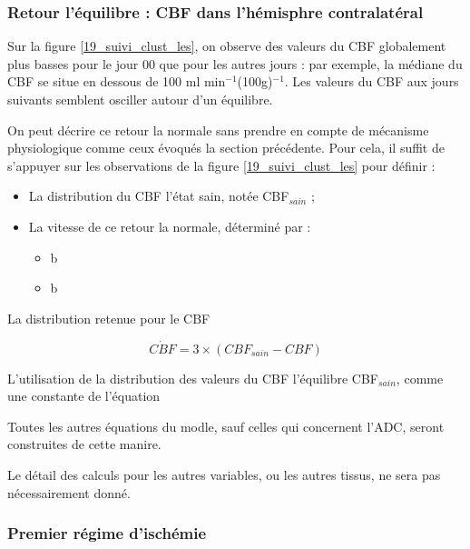\subsubsection{Retour  l'\'equilibre : CBF dans l'h\'emisphre contralat\'eral}

Sur la figure \ref{19_suivi_clust_les}, on observe des valeurs du CBF globalement plus basses pour le jour 00 que pour les autres jours : %
par exemple, la m\'ediane du CBF se situe en dessous de 100 ml min${}^{-1}$(100g)${}^{-1}$. %
Les valeurs du CBF aux jours suivants semblent osciller autour d'un \'equilibre.

\par
On peut d\'ecrire ce retour  la normale sans prendre en compte de m\'ecanisme physiologique comme ceux \'evoqu\'es  la section pr\'ec\'edente. %
Pour cela, il suffit de s'appuyer sur les observations de la figure \ref{19_suivi_clust_les} pour d\'efinir :
\begin{itemize}
\item La distribution du CBF  l'\'etat sain, not\'ee CBF${}_{sain}$ ;
\item La vitesse de ce retour  la normale, d\'etermin\'e par :
\begin{itemize}
\item b
\item b
\end{itemize}
\end{itemize}

La distribution retenue pour le CBF 

\begin{equation}
\dot{CBF}=3\times (CBF_{sain}-CBF)
\end{equation}

\par
L'utilisation de la distribution des valeurs du CBF  l'\'equilibre CBF${}_{sain}$, comme une constante de l'\'equation 


\par
Toutes les autres \'equations du modle, sauf celles qui concernent l'ADC, seront construites de cette manire.

\par
Le d\'etail des calculs pour les autres variables, ou les autres tissus, ne sera pas n\'ecessairement donn\'e.

\subsubsection{Premier r\'egime d'isch\'emie}





